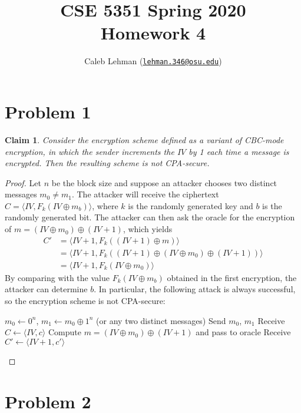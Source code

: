 \documentclass[12pt]{article}
\title{%
CSE 5351 Spring 2020\\
Homework 4
}
\author{%
Caleb Lehman
(\href{mailto:lehman.346@osu.edu}{\texttt{lehman.346@osu.edu}})
}
\date{%
}
\numberwithin{equation}{section}
\theoremstyle{plain}
\newtheorem{claim}{Claim}
\begin{document}
\maketitle

\section*{Problem 1}

\begin{claim}
Consider the encryption scheme defined as a variant of CBC-mode encryption,
in which the sender increments the $IV$ by 1 each time a message is encrypted.
Then the resulting scheme is not CPA-secure.
\end{claim}
\begin{proof}
Let $n$ be the block size and suppose an attacker chooses two distinct messages $m_0 \neq m_1$.
The attacker will receive the ciphertext $C = \langle IV, F_k(IV \oplus m_b) \rangle$,
where $k$ is the randomly generated key and $b$ is the randomly generated bit.
The attacker can then ask the oracle for the encryption of $m = (IV \oplus m_0) \oplus (IV + 1)$,
which yields
\begin{align*}
    C'
        &= \langle IV + 1, F_k((IV + 1) \oplus m) \rangle\\
        &= \langle IV + 1, F_k((IV + 1) \oplus (IV \oplus m_0) \oplus (IV + 1)) \rangle\\
        &= \langle IV + 1, F_k(IV \oplus m_0) \rangle
\end{align*}
By comparing with the value $F_k(IV \oplus m_b)$ obtained in the first encryption,
the attacker can determine $b$.
In particular, the following attack is always successful,
so the encryption scheme is not CPA-secure:
\begin{algorithm}[H]
\begin{algorithmic}
    \State $m_0 \gets 0^n$, $m_1 \gets m_0 \oplus 1^n$ (or any two distinct messages)
    \State Send $m_0$, $m_1$
    \State Receive $C \gets \langle IV, c \rangle$
    \State Compute $m = (IV \oplus m_0) \oplus (IV + 1)$ and pass to oracle
    \State Receive $C' \gets \langle IV + 1, c' \rangle$
        \State {}
    \Else
        \State {}
    \EndIf
\EndProcedure
\end{algorithmic}
\end{algorithm}
\end{proof}

\section*{Problem 2}
\end{document}
